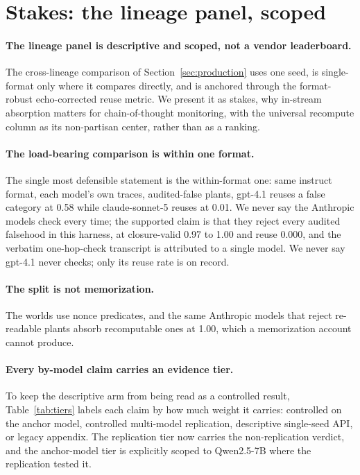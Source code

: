 \section{Stakes: the lineage panel, scoped}
\label{sec:stakes}


\paragraph{The lineage panel is descriptive and scoped, not a vendor
leaderboard.} The cross-lineage comparison of Section~\ref{sec:production}
uses one seed, is single-format only where it compares directly, and is
anchored through the format-robust echo-corrected reuse metric. We present
it as stakes, why in-stream absorption matters for chain-of-thought
monitoring, with the universal recompute column as its non-partisan center,
rather than as a ranking.

\paragraph{The load-bearing comparison is within one format.} The single
most defensible statement is the within-format one: same instruct format,
each model's own traces, audited-false plants, gpt-4.1 reuses a false
category at 0.58 while claude-sonnet-5 reuses at 0.01.
We never say the Anthropic models check every time; the supported claim is
that they reject every audited falsehood in this harness, at closure-valid
0.97 to 1.00 and reuse 0.000, and the verbatim one-hop-check transcript is
attributed to a single model. We never say gpt-4.1 never checks; only its
reuse rate is on record.

\paragraph{The split is not memorization.} The worlds use nonce predicates,
and the same Anthropic models that reject re-readable plants absorb
recomputable ones at 1.00, which a memorization account cannot produce.

\paragraph{Every by-model claim carries an evidence tier.} To keep the
descriptive arm from being read as a controlled result, Table~\ref{tab:tiers}
labels each claim by how much weight it carries: controlled on the anchor
model, controlled multi-model replication, descriptive single-seed API, or
legacy appendix. The replication tier now carries the non-replication
verdict, and the anchor-model tier is explicitly scoped to Qwen2.5-7B where
the replication tested it.

